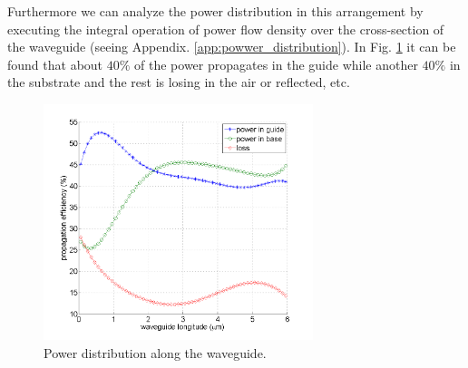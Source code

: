 Furthermore we can analyze the power distribution in this arrangement by executing the integral operation of power flow density over the cross-section of the waveguide (seeing Appendix. \ref{app:powwer_distribution}).  In Fig. \ref{fig:power_distribution} it can be found that about $40\%$ of the power propagates in the guide while another $40\%$ in the substrate and the rest is losing in the air or reflected, etc.
\begin{figure}[!ht]
\centering
\includegraphics[width=0.7\textwidth]{bilder/power_distribution1}
\caption{Power distribution along the waveguide.}
\label{fig:power_distribution}
\end{figure}
